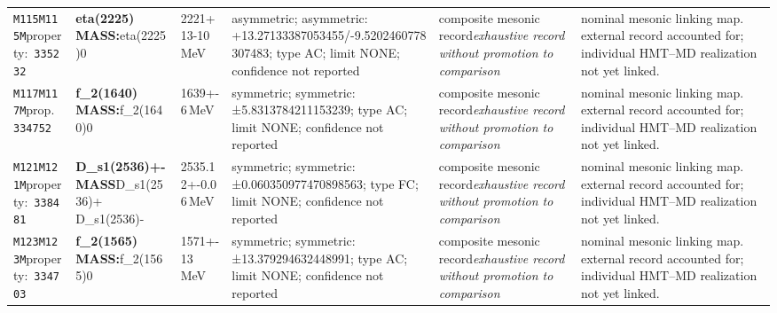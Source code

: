 \begin{landscape}
\begin{longtable}{L{1.85cm}L{4.45cm}L{2.35cm}L{4.05cm}L{3.35cm}L{7.15cm}}
\texttt{M115}\newline \texttt{M115M}\newline property:\ \texttt{335232} & \textbf{eta(2225) MASS:}\newline eta(2225)0 & 2221+13-10\,MeV & asymmetric; asymmetric: +13.27133387053455/-9.5202460778307483; type AC; limit NONE; confidence not reported & composite mesonic record\newline \emph{exhaustive record without promotion to comparison} & nominal mesonic linking map. external record accounted for; individual HMT--MD realization not yet linked. \\
\texttt{M117}\newline \texttt{M117M}\newline prop.\ \texttt{334752} & \textbf{f\_\allowbreak{}2(1640) MASS:}\newline f\_\allowbreak{}2(1640)0 & 1639+-6\,MeV & symmetric; symmetric: ±5.8313784211153239; type AC; limit NONE; confidence not reported & composite mesonic record\newline \emph{exhaustive record without promotion to comparison} & nominal mesonic linking map. external record accounted for; individual HMT--MD realization not yet linked. \\
\texttt{M121}\newline \texttt{M121M}\newline property:\ \texttt{338481} & \textbf{D\_\allowbreak{}s1(2536)+- MASS}\newline D\_\allowbreak{}s1(2536)+ \textbar{}\allowbreak{} D\_\allowbreak{}s1(2536)- & 2535.12+-0.06\,MeV & symmetric; symmetric: ±0.060350977470898563; type FC; limit NONE; confidence not reported & composite mesonic record\newline \emph{exhaustive record without promotion to comparison} & nominal mesonic linking map. external record accounted for; individual HMT--MD realization not yet linked. \\
\texttt{M123}\newline \texttt{M123M}\newline property:\ \texttt{334703} & \textbf{f\_\allowbreak{}2(1565) MASS:}\newline f\_\allowbreak{}2(1565)0 & 1571+-13\,MeV & symmetric; symmetric: ±13.379294632448991; type AC; limit NONE; confidence not reported & composite mesonic record\newline \emph{exhaustive record without promotion to comparison} & nominal mesonic linking map. external record accounted for; individual HMT--MD realization not yet linked. \\

\end{longtable}
\end{landscape}
